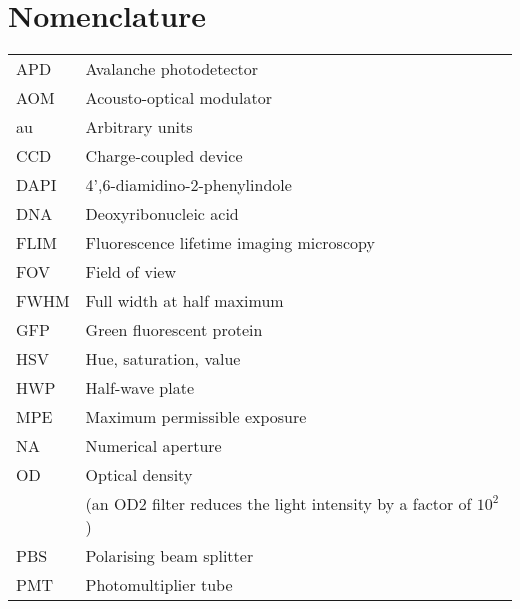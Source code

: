 \chapter{Nomenclature}

\begin{tabular}{ll}
	APD       & Avalanche photodetector                                             \\
	AOM       & Acousto-optical modulator                                           \\
	au        & Arbitrary units                                                     \\
	CCD       & Charge-coupled device                                               \\
	DAPI     & 4',6-diamidino-2-phenylindole                                       \\
	DNA       & Deoxyribonucleic acid                                               \\ %
	FLIM      & Fluorescence lifetime imaging microscopy                            \\
	FOV       & Field of view                                                       \\
	FWHM      & Full width at half maximum                                          \\
	GFP       & Green fluorescent protein                                           \\
	HSV       & Hue, saturation, value                                              \\
	HWP       & Half-wave plate                                                     \\
	MPE       & Maximum permissible exposure                                        \\
	NA        & Numerical aperture                                                  \\
	OD        & Optical density                                                     \\
	          & (an OD2 filter reduces the light intensity by a factor of $ 10^2 $) \\
	PBS       & Polarising beam splitter                                            \\
	PMT       & Photomultiplier tube                                                \\

\end{tabular}
